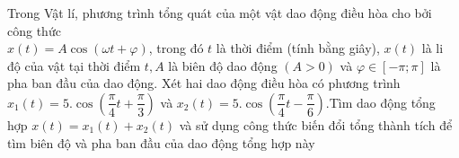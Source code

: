 \begin{bt}%
	
	Trong Vật lí, phương trình tổng quát của một vật dao động điều hòa cho bởi công thức\\ $x\left( t \right)=A\cos \left( \omega t+\varphi \right)$, trong đó $t$ là thời điểm (tính bằng giây), $x\left( t \right)$ là li độ của vật tại thời điểm $t,A$ là biên độ dao động $\left( A>0 \right)$ và $\varphi \in \left[ -\pi ;\pi \right]$ là pha ban đầu của dao động. Xét hai dao động điều hòa có phương trình ${x_1}\left( t \right)=5.\cos \left( \dfrac{\pi }{4}t+\dfrac{\pi }{3} \right)$ và ${x_2}\left( t \right)=5.\cos \left( \dfrac{\pi }{4}t-\dfrac{\pi }{6} \right)$.Tìm dao động tổng hợp $x\left( t \right)=x_1\left( t \right)+x_2\left( t \right)$ và sử dụng công thức biến đổi tổng thành tích để tìm biên độ và pha ban đầu của dao động tổng hợp này
\end{bt}

